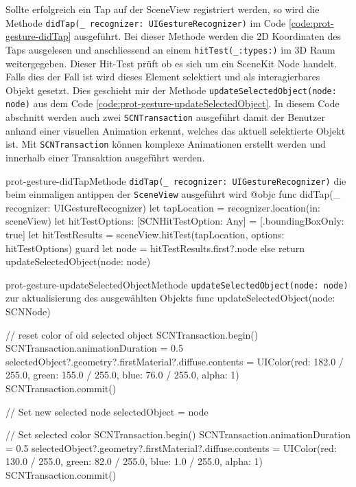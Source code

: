 \begin{description}
    Sollte erfolgreich ein Tap auf der SceneView registriert werden, so wird die Methode \texttt{didTap(\_ recognizer: UIGestureRecognizer)} im Code \ref{code:prot-gesture-didTap} ausgeführt. Bei dieser Methode werden die 2D Koordinaten des Taps ausgelesen und anschliessend an einem \texttt{hitTest(\_:types:)} im 3D Raum weitergegeben. Dieser Hit-Test prüft ob es sich um ein SceneKit Node handelt. Falls dies der Fall ist wird dieses Element selektiert und als interagierbares Objekt gesetzt. Dies geschieht mir der Methode \texttt{updateSelectedObject(node: node)} aus dem Code \ref{code:prot-gesture-updateSelectedObject}. In diesem Code abschnitt werden auch zwei \texttt{SCNTransaction} ausgeführt damit der Benutzer anhand einer visuellen Animation erkennt, welches das aktuell selektierte Objekt ist. Mit \texttt{SCNTransaction} können komplexe Animationen erstellt werden und innerhalb einer Transaktion ausgeführt werden.

    \begin{code}{prot-gesture-didTap}{Methode \texttt{didTap(\_ recognizer: UIGestureRecognizer)} die beim einmaligen antippen der \texttt{SceneView} ausgeführt wird}
    @objc
    func didTap(_ recognizer: UIGestureRecognizer) {
        let tapLocation = recognizer.location(in: sceneView)
        let hitTestOptions: [SCNHitTestOption: Any] = [.boundingBoxOnly: true]
        let hitTestResults = sceneView.hitTest(tapLocation, options: hitTestOptions)
        guard let node = hitTestResults.first?.node else {return}
        updateSelectedObject(node: node)
    }
    \end{code}

    \begin{code}{prot-gesture-updateSelectedObject}{Methode \texttt{updateSelectedObject(node: node)} zur aktualisierung des ausgewählten Objekts}
    func updateSelectedObject(node: SCNNode) {
        // reset color of old selected object
        SCNTransaction.begin()
        SCNTransaction.animationDuration = 0.5
        selectedObject?.geometry?.firstMaterial?.diffuse.contents = UIColor(red: 182.0 / 255.0, green: 155.0 / 255.0, blue: 76.0 / 255.0, alpha: 1)
        SCNTransaction.commit()
        
        // Set new selected node
        selectedObject = node
        
        // Set selected color
        SCNTransaction.begin()
        SCNTransaction.animationDuration = 0.5
        selectedObject?.geometry?.firstMaterial?.diffuse.contents = UIColor(red: 130.0 / 255.0, green: 82.0 / 255.0, blue: 1.0 / 255.0, alpha: 1)
        SCNTransaction.commit()
    }
    \end{code}


\end{description}
